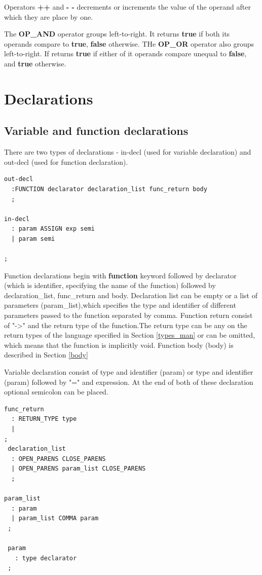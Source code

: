 \documentclass{l3proj}
\begin{document}
Operators \textbf{++} and \textbf{- -} decrements or increments the value of the operand after which they are place by one.

The \textbf{OP\_AND} operator groups left-to-right. It returns \textbf{true}  if both its operands compare to \textbf{true}, \textbf{false} otherwise. THe \textbf{OP\_OR} operator also groups left-to-right. If returns \textbf{true} if either of it operands compare unequal to \textbf{false}, and \textbf{true} otherwise. 


\section {Declarations}
\subsection{Variable and function declarations}
There are two types of declarations - in-decl (used for variable declaration) and out-decl (used for function declaration).
\begin{lstlisting}
out-decl
  :FUNCTION declarator declaration_list func_return body 
  ;

in-decl 
  : param ASSIGN exp semi
  | param semi 
    
;
\end{lstlisting}

Function declarations begin with \textbf{function} keyword followed by declarator (which is identifier, specifying the name of the function) followed by declaration\_list, func\_return and body. 
Declaration list can be empty  or  a list of parameters (param\_list),which specifies the type and identifier of different parameters passed to the function separated by comma. Function return consist of "-\textgreater" and the return type of the function.The return type can be any on the return types of the language specified in Section \ref{types_man} or can be omitted, which means that the function is implicitly void. Function body (body)  is described in Section \ref{body}

Variable declaration consist of type and identifier (param) or type and identifier (param) followed by "=" and expression. At the end of both of these declaration optional semicolon can be placed. 
\begin{lstlisting}
func_return  
  : RETURN_TYPE type
  |
;
 declaration_list 
  : OPEN_PARENS CLOSE_PARENS
  | OPEN_PARENS param_list CLOSE_PARENS
  ;

param_list
  : param 
  | param_list COMMA param
 ;

 param 
   : type declarator
 ; 
\end{lstlisting}
\end{document}
